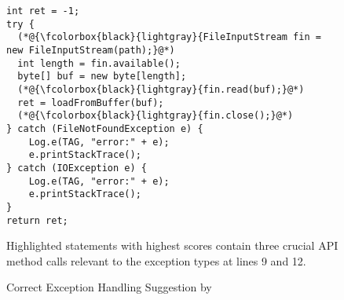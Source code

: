 \begin{figure}[t]
	\centering
\begin{lstlisting}[]
int ret = -1;
try {
  (*@{\fcolorbox{black}{lightgray}{FileInputStream fin = new FileInputStream(path);}@*)
  int length = fin.available();
  byte[] buf = new byte[length];
  (*@{\fcolorbox{black}{lightgray}{fin.read(buf);}@*)
  ret = loadFromBuffer(buf);
  (*@{\fcolorbox{black}{lightgray}{fin.close();}@*)
} catch (FileNotFoundException e) {
    Log.e(TAG, "error:" + e);
    e.printStackTrace();
} catch (IOException e) {
    Log.e(TAG, "error:" + e);
    e.printStackTrace();
}
return ret;
\end{lstlisting}
\vspace{-9pt}
Highlighted statements with highest scores contain three crucial API method
calls relevant to the exception types at lines 9 and 12.
\vspace{-9pt}
        \caption{Correct Exception Handling Suggestion by {\tool}}
        \label{fig:example-experiment}
\end{figure}

